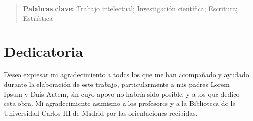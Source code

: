 \documentclass[12pt]{report} %
\begin{document}
	\newpage %
	\thispagestyle{empty}
	\mbox{}

\renewcommand\abstractname{\large\bfseries\filcenter\uppercase{Resumen}}
\begin{abstract}
\thispagestyle{plain}
\setcounter{page}{3}
	
	\lipsum[1-3]
	
	\textbf{Palabras clave:}
	Trabajo intelectual; Investigación científica; Escritura; Estilística
	
	\vfill
\end{abstract}
	\newpage %
	\thispagestyle{empty}
	\mbox{}


\chapter*{Dedicatoria}

\setcounter{page}{5}
	
	Deseo expresar mi agradecimiento a todos los que me han acompañado y ayudado durante la elaboración de este trabajo, particularmente a mis padres Lorem Ipsum y Duis Autem, sin cuyo apoyo no habría sido posible, y a los que dedico esta obra. Mi agradecimiento asimismo a los profesores y a la Biblioteca de la Universidad Carlos III de Madrid por las 
	orientaciones recibidas.	
		
	\vfill
	
	\newpage %
	\thispagestyle{empty}
	\mbox{}
	


\tableofcontents
\thispagestyle{fancy}

\newpage %
\thispagestyle{empty}
\mbox{}

\listoffigures
\thispagestyle{fancy}

\newpage %
\thispagestyle{empty}
\mbox{}

\listoftables
\thispagestyle{fancy}

\newpage %
\thispagestyle{empty}
\mbox{}


\clearpage
{} %
\end{document}
